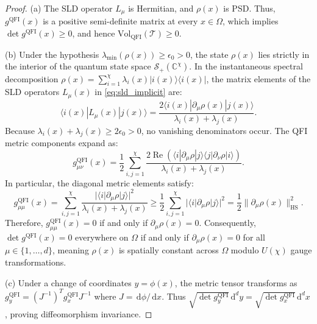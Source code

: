 \documentclass[11pt,a4paper,reqno]{amsart}
\theoremstyle{definition}
\numberwithin{equation}{section}
\newcommand{\dif}{\,\mathrm{d}}
\begin{document}
\begin{proof}
(a) The SLD operator $L_\mu$ is Hermitian, and $\rho(x)$ is PSD. Thus, $g^{\mathrm{QFI}}(x)$ is a positive semi-definite matrix at every $x \in \Omega$, which implies $\det g^{\mathrm{QFI}}(x) \ge 0$, and hence $\mathrm{Vol}_{\mathrm{QFI}}(\mathcal{T}) \ge 0$.

(b) Under the hypothesis $\lambda_{\min}(\rho(x)) \ge \epsilon_0 > 0$, the state $\rho(x)$ lies strictly in the interior of the quantum state space $\mathcal{S}_+(\mathbb{C}^\chi)$. In the instantaneous spectral decomposition $\rho(x) = \sum_{i=1}^\chi \lambda_i(x) |i(x)\rangle\langle i(x)|$, the matrix elements of the SLD operators $L_\mu(x)$ in \eqref{eq:sld_implicit} are:
\begin{equation}
    \langle i(x) | L_\mu(x) | j(x) \rangle = \frac{2 \langle i(x) | \partial_\mu \rho(x) | j(x) \rangle}{\lambda_i(x) + \lambda_j(x)}.
\end{equation}
Because $\lambda_i(x) + \lambda_j(x) \ge 2\epsilon_0 > 0$, no vanishing denominators occur. The QFI metric components expand as:
\begin{equation}
    g^{\mathrm{QFI}}_{\mu\nu}(x) = \frac{1}{2} \sum_{i,j=1}^\chi \frac{2 \operatorname{Re} \left( \langle i | \partial_\mu \rho | j \rangle \langle j | \partial_\nu \rho | i \rangle \right)}{\lambda_i(x) + \lambda_j(x)}.
\end{equation}
In particular, the diagonal metric elements satisfy:
\begin{equation}
    g^{\mathrm{QFI}}_{\mu\mu}(x) = \sum_{i,j=1}^\chi \frac{|\langle i | \partial_\mu \rho | j \rangle|^2}{\lambda_i(x) + \lambda_j(x)} \ge \frac{1}{2} \sum_{i,j=1}^\chi |\langle i | \partial_\mu \rho | j \rangle|^2 = \frac{1}{2} \|\partial_\mu \rho(x)\|_{\mathrm{HS}}^2.
\end{equation}
Therefore, $g^{\mathrm{QFI}}_{\mu\mu}(x) = 0$ if and only if $\partial_\mu \rho(x) = 0$. Consequently, $\det g^{\mathrm{QFI}}(x) = 0$ everywhere on $\Omega$ if and only if $\partial_\mu \rho(x) = 0$ for all $\mu \in \{1, \dots, d\}$, meaning $\rho(x)$ is spatially constant across $\Omega$ modulo $U(\chi)$ gauge transformations.

(c) Under a change of coordinates $y = \phi(x)$, the metric tensor transforms as $g^{\mathrm{QFI}}_y = (J^{-1})^T g^{\mathrm{QFI}}_x J^{-1}$ where $J = \dif \phi / \dif x$. Thus $\sqrt{\det g^{\mathrm{QFI}}_y} \dif^d y = \sqrt{\det g^{\mathrm{QFI}}_x} \dif^d x$, proving diffeomorphism invariance.
\end{proof}
\end{document}
